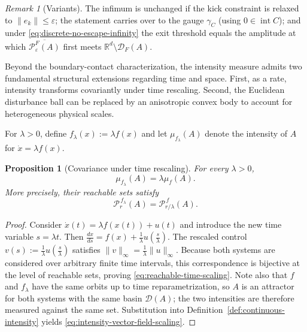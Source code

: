 \documentclass[pdflatex,sn-mathphys-num]{sn-jnl}
\numberwithin{equation}{section}
\theoremstyle{thmstyleone}%
\newtheorem{proposition}[theorem]{Proposition}
\theoremstyle{definition}
\theoremstyle{remark}
\newtheorem{remark}[theorem]{Remark}
\begin{document}
\begin{remark}[Variants]
\label{rem:discrete-first-contact-variants}
The infimum is unchanged if the kick constraint is relaxed to $\|e_k\|\le\varepsilon$; the statement carries over to the gauge $\gamma_C$ (using $0\in\operatorname{int}C$); and under \eqref{eq:discrete-no-escape-infinity} the exit threshold equals the amplitude at which $\overline{\mathcal P^F_\varepsilon(A)}$ first meets $\mathbb R^d\setminus\mathcal D_F(A)$.
\end{remark}

Beyond the boundary-contact characterization, the intensity measure admits two fundamental structural extensions regarding time and space. First, as a rate, intensity transforms covariantly under time rescaling. Second, the Euclidean disturbance ball can be replaced by an anisotropic convex body to account for heterogeneous physical scales.

For $\lambda>0$, define $f_\lambda(x):=\lambda f(x)$ and let $\mu_{f_\lambda}(A)$ denote the intensity of $A$ for $\dot x=\lambda f(x)$.

\begin{proposition}[Covariance under time rescaling]
\label{prop:time-rescaling}
For every $\lambda>0$,
\begin{equation}
\label{eq:intensity-vector-field-scaling}
    \mu_{f_\lambda}(A)
    =
    \lambda\mu_f(A).
\end{equation}
More precisely, their reachable sets satisfy
\begin{equation}
\label{eq:reachable-time-scaling}
    \mathcal P_r^{\,f_\lambda}(A)
    =
    \mathcal P_{r/\lambda}^{\,f}(A).
\end{equation}
\end{proposition}

\begin{proof}
Consider
$\dot x(t)=\lambda f(x(t))+u(t)$
and introduce the new time variable $s=\lambda t$. Then
    $\frac{dx}{ds}
    =
    f(x)+\frac1\lambda u\left(\frac{s}{\lambda}\right)$.
The rescaled control
    $v(s):=
    \frac1\lambda u\left(\frac{s}{\lambda}\right)$
satisfies
    $\|v\|_\infty=\frac1\lambda\|u\|_\infty$.
Because both systems are considered over arbitrary finite time intervals, this correspondence is bijective at the level of reachable sets, proving \eqref{eq:reachable-time-scaling}. Note also that $f$ and $f_\lambda$ have the same orbits up to time reparametrization, so $A$ is an attractor for both systems with the same basin $\mathcal D(A)$; the two intensities are therefore measured against the same set. Substitution into Definition~\ref{def:continuous-intensity} yields \eqref{eq:intensity-vector-field-scaling}.
\end{proof}
\end{document}
